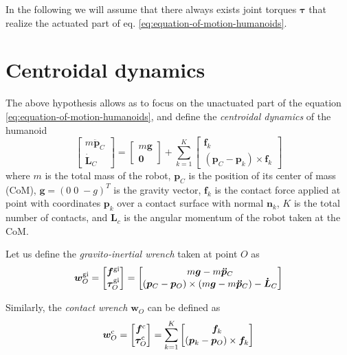 In the following we will assume that there always exists joint torques
$\bm{\tau}$ that realize the actuated part of eq.
\eqref{eq:equation-of-motion-humanoids}.

\section{Centroidal dynamics}
The above hypothesis allows as to focus on the unactuated part of the equation
\eqref{eq:equation-of-motion-humanoids}, and define the
\textit{centroidal dynamics} \cite{Orin2013CentroidalDynamics} of the humanoid
\begin{equation}
    \label{eq:centroidal-dynamics}
    \begin{bmatrix}
        m \ddot{\bm{p}}_C \\ \dot{\bm{L}}_C
    \end{bmatrix} =
    \begin{bmatrix}
        m \bm{g} \\ \bm{0}
    \end{bmatrix} +
    \sum_{k=1}^K
    \begin{bmatrix}
        \bm{f}_k \\ (\bm{p}_C - \bm{p}_k) \times \bm{f}_k
    \end{bmatrix}
\end{equation}
where $m$ is the total mass of the robot, $\bm{p}_C$ is the position of its
center of mass (CoM),
$\bm{g} = (0 \; 0 \; -g)^T$ is the gravity vector, $\bm{f}_k$ is the contact force
applied at point with coordinates $\bm{p}_k$ over a contact surface with normal
$\bm{n}_k$, $K$ is the total number of contacts, and $\bm{L}_c$ is the angular
momentum of the robot taken at the CoM.

Let us define the \textit{gravito-inertial wrench} taken at point $O$ as
\begin{equation}
    \label{eq:gravito-intertial-wrench}
    \bm{w}_O^{\rm gi}
    =
    \begin{bmatrix}
        \bm{f}^{\rm gi}\\
        \bm{\tau}_O^{\rm gi}
    \end{bmatrix}
    =
    \begin{bmatrix}
        m \bm{g} - m \bm{\ddot{p}}_C \\
        (\bm{p}_C - \bm{p}_O) \times (m \bm{g} - m \bm{\ddot{p}}_C) - \bm{\dot{L}}_C
    \end{bmatrix}
\end{equation}

Similarly, the \textit{contact wrench} $\bm{w}_O$ can be defined as
\begin{equation}
    \label{eq:contact-wrench}
    \bm{w}_O^{\rm c}
    =
    \begin{bmatrix}
        \bm{f}^{\rm c} \\
        \bm{\tau}_O^{\rm c}
    \end{bmatrix}
    =
    \sum_{k=1}^K
    \begin{bmatrix}
        \bm{f}_k\\
        (\bm{p}_k - \bm{p}_O) \times \bm{f}_k
    \end{bmatrix}
\end{equation}

